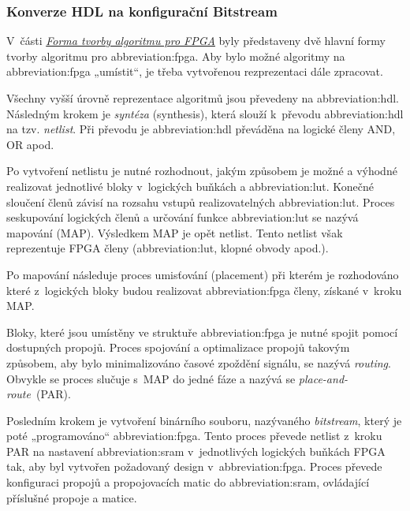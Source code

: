 \documentclass[a4paper, twoside, 11pt]{article}
\begin{document}
		\subsubsection{Konverze HDL na konfigurační Bitstream}
			V~části \hyperref[subsubsec:forma-tvorby-algoritmu-pro-fpga]{\textit{Forma tvorby algoritmu pro FPGA}} byly představeny dvě hlavní formy tvorby algoritmu pro \gls{abbreviation:fpga}. Aby bylo možné algoritmy na \gls{abbreviation:fpga} „umístit“, je třeba vytvořenou rezprezentaci dále zpracovat.\par
			Všechny vyšší úrovně reprezentace algoritmů jsou převedeny na \gls{abbreviation:hdl}. Následným krokem je \textit{syntéza} (synthesis), která slouží k~převodu \gls{abbreviation:hdl} na tzv. \textit{netlist}. Při převodu je \gls{abbreviation:hdl} převáděna na logické členy AND, OR apod. \cite{Sass2010}\par
			Po vytvoření netlistu je nutné rozhodnout, jakým způsobem je možné a výhodné realizovat jednotlivé bloky v~logických buňkách a \gls{abbreviation:lut}. Konečné sloučení členů závisí na rozsahu vstupů realizovatelných \gls{abbreviation:lut}. Proces seskupování logických členů a určování funkce \gls{abbreviation:lut} se nazývá mapování (MAP). Výsledkem MAP je opět netlist. Tento netlist však reprezentuje FPGA členy (\gls{abbreviation:lut}, klopné obvody apod.). \cite{Sass2010}\par
			Po mapování následuje proces umisťování (placement) při kterém je rozhodováno které z~logických bloky budou realizovat \gls{abbreviation:fpga} členy, získané v~kroku MAP. \cite{Sass2010}\par
			Bloky, které jsou umístěny ve struktuře \gls{abbreviation:fpga} je nutné spojit pomocí dostupných propojů. Proces spojování a optimalizace propojů takovým způsobem, aby bylo minimalizováno časové zpoždění signálu, se nazývá \textit{routing}. Obvykle se proces slučuje s~MAP do jedné fáze a nazývá se \textit{place-and-route}~(PAR). \cite{Sass2010} \par
			Posledním krokem je vytvoření binárního souboru, nazývaného \textit{bitstream}, který je poté „programováno“ \gls{abbreviation:fpga}. Tento proces převede netlist z~kroku PAR na nastavení \gls{abbreviation:sram} v~jednotlivých logických buňkách FPGA tak, aby byl vytvořen požadovaný design v~\gls{abbreviation:fpga}. Proces převede konfiguraci propojů a propojovacích matic do \gls{abbreviation:sram}, ovládající příslušné propoje a matice. \cite{Sass2010}\par
\end{document}
